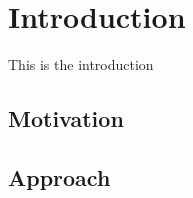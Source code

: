 \section{Introduction}
\label{sec:introduction}
This is the introduction

\subsection{Motivation}


\subsection{Approach}



